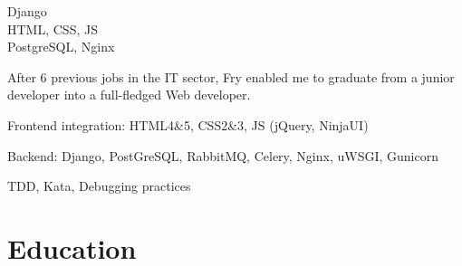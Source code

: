 \documentclass[a4paper,11pt]{cv4tw}%
\begin{document}
{Django\\HTML, CSS, JS\\PostgreSQL, Nginx}
	{ After 6 previous jobs in the IT sector, Fry enabled me to graduate from a junior developer into a full-fledged Web developer.
	\begin{missions}
    \item Frontend integration: HTML4\&5, CSS2\&3, JS (jQuery, NinjaUI)
    \item Backend: Django, PostGreSQL, RabbitMQ, Celery, Nginx, uWSGI, Gunicorn
    \item TDD, Kata, Debugging practices
	\end{missions}
}
\section{Education}

\end{document}
